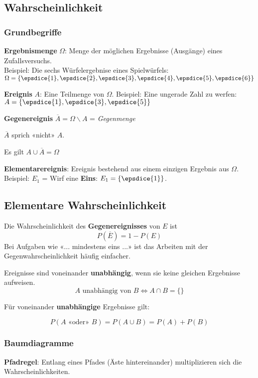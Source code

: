 \begin{multicols}{2}


\subsection*{Wahrscheinlichkeit}
\subsubsection*{Grundbegriffe}

\textbf{Ergebnismenge} $\Omega$: Menge der möglichen Ergebnisse
(Ausgänge) eines Zufallsversuchs.\\
Beispiel: Die sechs Würfelergebnise
eines Spielwürfels: $\Omega = \{\epsdice{1}, \epsdice{2}, \epsdice{3}, \epsdice{4}, \epsdice{5}, \epsdice{6}\}$

\textbf{Ereignis} $A$: Eine Teilmenge von $\Omega$. Beispiel: Eine
ungerade Zahl zu werfen: $A  = \{\epsdice{1}, \epsdice{3}, \epsdice{5}\}$

\textbf{Gegenereignis} $\overline{A} = \Omega \backslash A$ =
\textit{Gegenmenge}

$\overline{A}$ sprich «nicht» $A$.

Es gilt $A \cup \overline{A} = \Omega$

\textbf{Elementarereignis}: Ereignis bestehend aus einem einzigen
Ergebnis aus $\Omega$. Beispiel: $E_1$ = Wirf eine \textbf{Eins}: $E_1
= \{\epsdice{1}\}$.


\subsection*{Elementare Wahrscheinlichkeit}
Die Wahrscheinlichkeit des \textbf{Gegenereignisses} von $E$ ist
$$P(\overline{E}) = 1- P(E)$$
Bei Aufgaben wie «... mindestens eins ...» ist das Arbeiten mit der
Gegenwahrscheinlichkeit häufig einfacher.

Ereignisse sind voneinander \textbf{unabhängig}, wenn sie keine
gleichen Ergebnisse aufweisen.
$$A \textrm{ unabhängig von } B \Leftrightarrow A\cap B=\{\}$$

Für voneinander \textbf{unabhängige} Ergebnisse 
gilt:

$$P(A\textrm{ «oder» }B) = P(A\cup B) = P(A) + P(B)$$


\subsubsection*{Baumdiagramme}

\textbf{Pfadregel}:
Entlang eines Pfades (Äste hintereinander) multiplizieren sich die
Wahrscheinlichkeiten.


\end{multicols}

